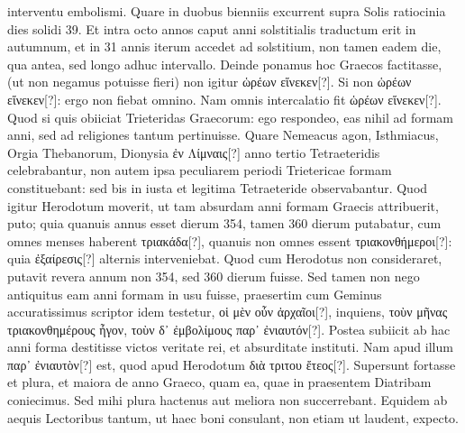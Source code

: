 interventu embolismi.
Quare in duobus bienniis excurrent supra
Solis ratiocinia dies solidi 39.
Et intra octo annos caput anni solstitialis
traductum erit in autumnum, et in 31 annis iterum accedet ad
solstitium, non tamen eadem die, qua antea, sed longo adhuc intervallo.
Deinde ponamus hoc Graecos factitasse, (ut non negamus potuisse
fieri) non igitur \textgreek{ὡρέων εἵνεκεν[?]}.
%
Si non \textgreek{ὡρέων εἵνεκεν[?]}: ergo non fiebat
omnino.
Nam omnis intercalatio fit \textgreek{ὡρέων εἵνεκεν[?]}.
Quod si quis
obiiciat Trieteridas Graecorum: ego respondeo, eas nihil ad formam
anni, sed ad religiones tantum pertinuisse.
Quare Nemeacus agon,
Isthmiacus, Orgia Thebanorum, Dionysia \textgreek{ἐν Λίμναις[?]}
 anno tertio Tetraeteridis
celebrabantur, non autem ipsa peculiarem periodi Trietericae
formam constituebant: sed bis in iusta et legitima Tetraeteride
observabantur.
Quod igitur Herodotum moverit, ut tam absurdam
anni formam Graecis attribuerit, puto; quia quanuis annus esset dierum
354, tamen 360 dierum putabatur, cum omnes menses haberent
\textgreek{τριακάδα[?]}, quanuis non omnes essent
 \textgreek{τριακονθήμεροι[?]}: quia \textgreek{ἐξαίρεσις[?]}
alternis interveniebat.
Quod cum Herodotus non consideraret, putavit
revera annum non 354, sed 360 dierum fuisse.
Sed tamen non
nego antiquitus eam anni formam in usu fuisse, praesertim cum Geminus
accuratissimus scriptor idem testetur,
 \textgreek{οἱ μὲν οὖν ἀρχαῖοι[?]}, inquiens,
\textgreek{τοὺν μῆνας τριακονθημέρους ἦγον,
 τοὺν δ᾽ ἐμβολίμους παρ᾽ ἐνιαυτόν[?]}.
Postea subiicit ab hac anni forma destitisse victos veritate rei,
 et absurditate
instituti.
Nam apud illum \textgreek{παρ᾽ ἐνιαυτὸν[?]} est, quod apud Herodotum
\textgreek{διὰ τριτου ἔτεος[?]}.
Supersunt fortasse et plura, et maiora de
anno Graeco, quam ea, quae in praesentem Diatribam coniecimus.
Sed mihi plura hactenus aut meliora non succerrebant.
Equidem ab
aequis Lectoribus tantum, ut haec boni consulant, non etiam ut laudent,
expecto.
